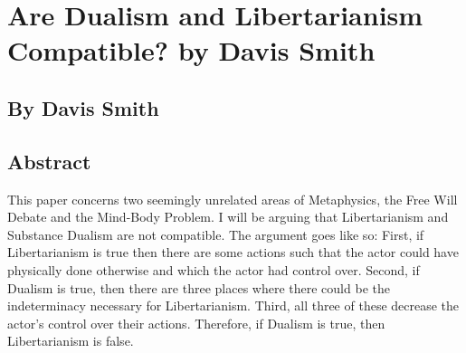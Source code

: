 \chapter{Are Dualism and Libertarianism Compatible? by Davis Smith}
\label{libertarianismdualism}
\section{By Davis Smith}
\section{Abstract}
\setcounter{fb}{\thefootnote}
\setcounter{footnote}{0}

This paper concerns two seemingly unrelated areas of Metaphysics, the Free Will Debate and the Mind-Body Problem. I will be arguing that Libertarianism and Substance Dualism are not compatible. The argument goes like so:  First, if Libertarianism is true then there are some actions such that the actor could have physically done otherwise and which the actor had control over. Second, if Dualism is true, then there are three places where there could be the indeterminacy necessary for Libertarianism. Third, all three of these decrease the actor’s control over their actions.  Therefore, if Dualism is true, then Libertarianism is false.

